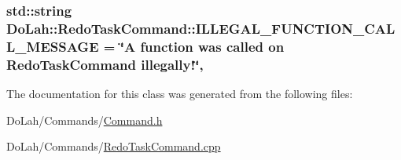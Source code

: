 \subsubsection[{I\+L\+L\+E\+G\+A\+L\+\_\+\+F\+U\+N\+C\+T\+I\+O\+N\+\_\+\+C\+A\+L\+L\+\_\+\+M\+E\+S\+S\+A\+G\+E}]{\setlength{\rightskip}{0pt plus 5cm}std\+::string Do\+Lah\+::\+Redo\+Task\+Command\+::\+I\+L\+L\+E\+G\+A\+L\+\_\+\+F\+U\+N\+C\+T\+I\+O\+N\+\_\+\+C\+A\+L\+L\+\_\+\+M\+E\+S\+S\+A\+G\+E = \char`\"{}A function was called on {\bf Redo\+Task\+Command} illegally!\char`\"{}\hspace{0.3cm}{\ttfamily [static]}, {\ttfamily [private]}}\label{class_do_lah_1_1_redo_task_command_a200079b89779607d2603053068ecc722}


The documentation for this class was generated from the following files\+:\begin{DoxyCompactItemize}
\item 
Do\+Lah/\+Commands/\hyperlink{_command_8h}{Command.\+h}\item 
Do\+Lah/\+Commands/\hyperlink{_redo_task_command_8cpp}{Redo\+Task\+Command.\+cpp}\end{DoxyCompactItemize}
